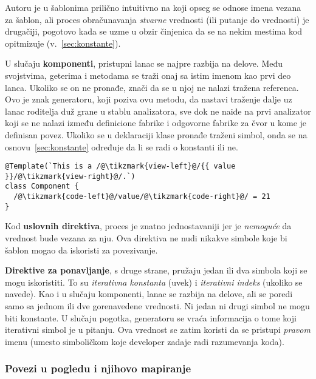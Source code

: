 Autoru je u šablonima prilično intuitivno na koji opseg se odnose imena vezana za šablon, ali proces obračunavanja \emph{stvarne} vrednosti (ili putanje do vrednosti) je drugačiji, pogotovo kada se uzme u obzir činjenica da se na nekim mestima kod opitmizuje (v.~\cref{sec:konstante}).

U slučaju \textbf{komponenti}, pristupni lanac se najpre razbija na delove.
Među svojstvima, geterima i metodama se traži onaj sa istim imenom kao prvi deo lanca.
Ukoliko se on ne pronađe, znači da se u njoj ne nalazi tražena referenca.
Ovo je znak generatoru, koji poziva ovu metodu, da nastavi traženje dalje uz lanac roditelja duž grane u stablu analizatora, sve dok ne naiđe na prvi analizator koji se ne nalazi između definicione fabrike i odgovorne fabrike za čvor u kome je definisan povez.
Ukoliko se u deklaraciji klase pronađe traženi simbol, onda se na osnovu~\cref{sec:konstante} određuje da li se radi o konstanti ili ne.

\begin{lstlisting}
@Template(`This is a /@\tikzmark{view-left}@/{{ value }}/@\tikzmark{view-right}@/.`)
class Component {
  /@\tikzmark{code-left}@/value/@\tikzmark{code-right}@/ = 21
}
\end{lstlisting}

Kod \textbf{uslovnih direktiva}, proces je znatno jednostavaniji jer je \emph{nemoguće} da vrednost bude vezana za nju.
Ova direktiva ne nudi nikakve simbole koje bi šablon mogao da iskoristi za povezivanje.

\textbf{Direktive za ponavljanje}, s druge strane, pružaju jedan ili dva simbola koji se mogu iskoristiti.
To su \textit{iterativna konstanta} (uvek) i \textit{iterativni indeks} (ukoliko se navede).
Kao i u slučaju komponenti, lanac se razbija na delove, ali se poredi samo sa jednom ili dve gorenavedene vrednosti.
Ni jedan ni drugi simbol ne mogu biti konstante.
U slučaju pogotka, generatoru se vraća informacija o tome koji iterativni simbol je u pitanju.
Ova vrednost se zatim koristi da se pristupi \emph{pravom} imenu (umesto simboličkom koje developer zadaje radi razumevanja koda).

\subsubsection{Povezi u pogledu i njihovo mapiranje}\label{sec:getPropsBoundToView}

